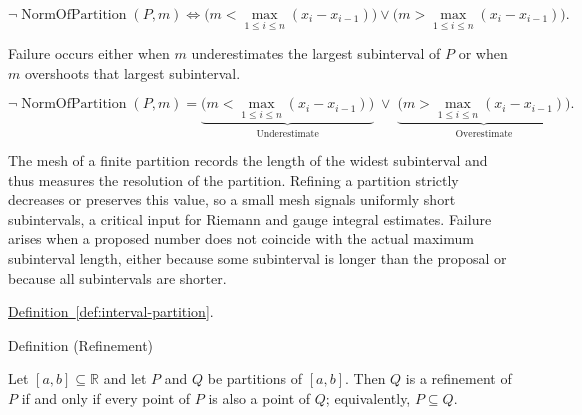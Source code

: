 \begin{remark*}
\[
\neg\operatorname{NormOfPartition}(P,m)
\Longleftrightarrow
\bigl(m<\max_{1\le i\le n}(x_i - x_{i-1})\bigr)\lor\bigl(m>\max_{1\le i\le n}(x_i - x_{i-1})\bigr).
\]
\end{remark*}

\begin{remark*}
Failure occurs either when $m$ underestimates the largest subinterval of $P$ or when $m$ overshoots that largest subinterval.
\end{remark*}

\begin{remark*}
\[
\neg\operatorname{NormOfPartition}(P,m)
=
\underbrace{\bigl(m<\max_{1\le i\le n}(x_i - x_{i-1})\bigr)}_{\text{Underestimate}}
\;\lor\;
\underbrace{\bigl(m>\max_{1\le i\le n}(x_i - x_{i-1})\bigr)}_{\text{Overestimate}}.
\]
\end{remark*}

\begin{remark*}[Interpretation]
The mesh of a finite partition records the length of the widest subinterval and thus measures the resolution of the partition. Refining a partition strictly decreases or preserves this value, so a small mesh signals uniformly short subintervals, a critical input for Riemann and gauge integral estimates. Failure arises when a proposed number does not coincide with the actual maximum subinterval length, either because some subinterval is longer than the proposal or because all subintervals are shorter.
\end{remark*}

\begin{remark*}[Dependencies]
\hyperref[def:interval-partition]{Definition~\ref{def:interval-partition}}.
\end{remark*}



\begin{definitionbox}{Definition (Refinement)}
\begin{definition}[Refinement]
\label{def:refinement-of-partition}
Let $[a,b] \subseteq \mathbb{R}$ and let $P$ and $Q$ be partitions of $[a,b]$. Then $Q$ is a refinement of $P$ if and only if every point of $P$ is also a point of $Q$; equivalently, $P \subseteq Q$.
\end{definition}
\end{definitionbox}


